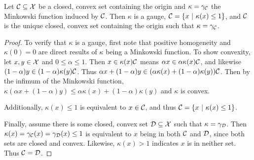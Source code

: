\begin{prop} 			\label{Prop:P-GD-Minkowski_set_unique}
Let ${\mathcal C} \subseteq {\mathcal X}$ be a closed, convex set containing the origin and $\kappa = \gamma_{\mathcal C}$ the Minkowski function induced by ${\mathcal C}$.  Then $\kappa$ is a gauge, ${\mathcal C} = \{ x \ | \ \kappa(x) \leq 1 \}$, and ${\mathcal C}$ is the unique closed, convex set containing the origin such that $\kappa = \gamma_{\mathcal C}$.
\end{prop}
\begin{proof}
To verify that $\kappa$ is a gauge, first note that positive homogeneity and $\kappa(0) = 0$ are direct results of $\kappa$ being a Minkowski function.  To show convexity, let $x, y \in {\mathcal X}$ and $0 \leq \alpha \leq 1$.  Then $x \in \kappa(x) {\mathcal C}$ means $\alpha x \in \alpha \kappa(x) {\mathcal C}$, and likewise $(1-\alpha) y \in (1-\alpha) \kappa(y) {\mathcal C}$.  Thus $\alpha x + (1-\alpha)y \in (\alpha \kappa(x) + (1-\alpha) \kappa(y)) {\mathcal C}$.  Then by the infimum of the Minkowski function, $\kappa(\alpha x + (1-\alpha) y) \leq \alpha \kappa(x) + (1-\alpha) \kappa(y)$ and $\kappa$ is convex.

Additionally, $\kappa(x) \leq 1$ is equivalent to $x \in {\mathcal C}$, and thus ${\mathcal C} =  \{ x \ | \ \kappa(x) \leq 1 \}$.

Finally, assume there is some closed, convex set ${\mathcal D} \subseteq {\mathcal X}$ such that $\kappa = \gamma_{\mathcal D}$.  Then $\kappa(x) = \gamma_{\mathcal C}(x) = \gamma_{\mathcal D}(x) \leq 1$ is equivalent to $x$ being in both ${\mathcal C}$ and ${\mathcal D}$, since both sets are closed and convex. Likewise, $\kappa(x) > 1$ indicates $x$ is in neither set.  Thus ${\mathcal C} = {\mathcal D}$.

\end{proof}

